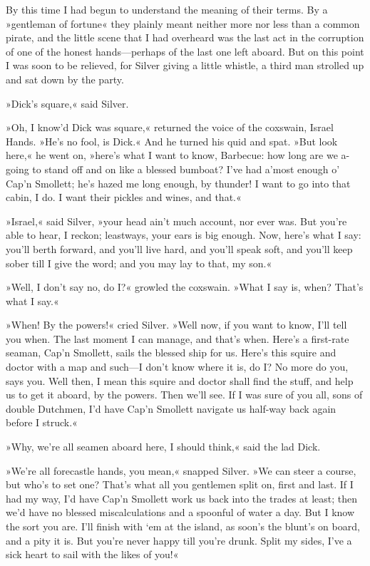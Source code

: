 By this time I had begun to understand the meaning of their terms. By a »gentleman of fortune« they plainly meant neither more nor less than a common pirate, and the little scene that I had overheard was the last act in the corruption of one of the honest hands—perhaps of the last one left aboard. But on this point I was soon to be relieved, for Silver giving a little whistle, a third man strolled up and sat down by the party.

»Dick's square,« said Silver.

»Oh, I know'd Dick was square,« returned the voice of the coxswain, Israel Hands. »He's no fool, is Dick.« And he turned his quid and spat. »But look here,« he went on, »here's what I want to know, Barbecue: how long are we a-going to stand off and on like a blessed bumboat? I've had a'most enough o' Cap'n Smollett; he's hazed me long enough, by thunder! I want to go into that cabin, I do. I want their pickles and wines, and that.«

»Israel,« said Silver, »your head ain't much account, nor ever was. But you're able to hear, I reckon; leastways, your ears is big enough. Now, here's what I say: you'll berth forward, and you'll live hard, and you'll speak soft, and you'll keep sober till I give the word; and you may lay to that, my son.«

»Well, I don't say no, do I?« growled the coxswain. »What I say is, when? That's what I say.«

»When! By the powers!« cried Silver. »Well now, if you want to know, I'll tell you when. The last moment I can manage, and that's when. Here's a first-rate seaman, Cap'n Smollett, sails the blessed ship for us. Here's this squire and doctor with a map and such—I don't know where it is, do I? No more do you, says you. Well then, I mean this squire and doctor shall find the stuff, and help us to get it aboard, by the powers. Then we'll see. If I was sure of you all, sons of double Dutchmen, I'd have Cap'n Smollett navigate us half-way back again before I struck.«

»Why, we're all seamen aboard here, I should think,« said the lad Dick.

»We're all forecastle hands, you mean,« snapped Silver. »We can steer a course, but who's to set one? That's what all you gentlemen split on, first and last. If I had my way, I'd have Cap'n Smollett work us back into the trades at least; then we'd have no blessed miscalculations and a spoonful of water a day. But I know the sort you are. I'll finish with `em at the island, as soon's the blunt's on board, and a pity it is. But you're never happy till you're drunk. Split my sides, I've a sick heart to sail with the likes of you!«

